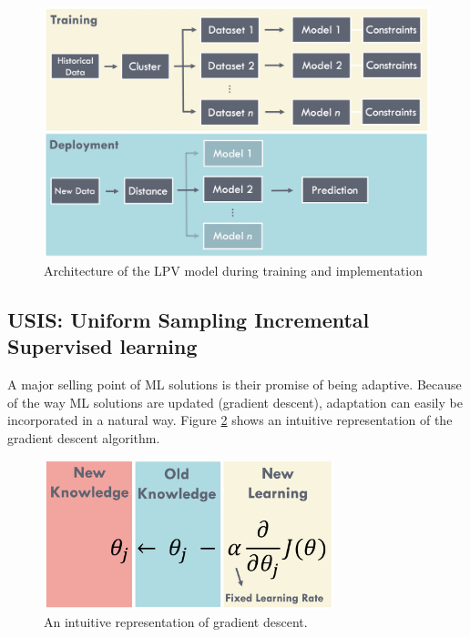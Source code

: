 \begin{figure}[h]
    \centering
    \includegraphics[width=\textwidth]{images/ch2/02lpv_architecture.jpeg}
    \caption{Architecture of the LPV model during training and implementation}
    \label{fig:02lpv_architecture}
\end{figure}

\subsection{USIS: Uniform Sampling Incremental Supervised learning}
A major selling point of ML solutions is their promise of being adaptive. Because of the way ML solutions are updated (gradient descent), adaptation can easily be incorporated in a natural way. Figure \ref{fig:02GradDesc} shows an intuitive representation of the gradient descent algorithm.

\begin{figure}[h]
    \centering
    \includegraphics[width=0.75\textwidth]{images/ch2/02GradDesc}
    \caption{An intuitive representation of gradient descent.}
    \label{fig:02GradDesc}
\end{figure}


